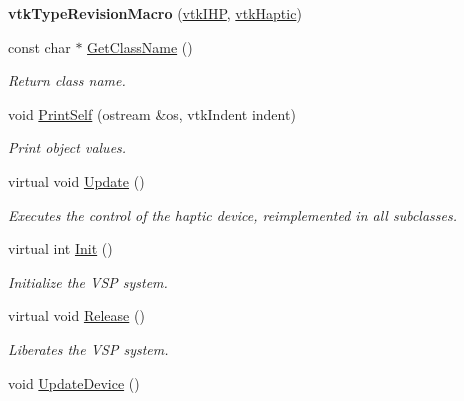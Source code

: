 \begin{DoxyCompactItemize}
\item 
\hypertarget{classvtkIHP_a00411adcf823417149c18bb208d31d4b}{
{\bfseries vtkTypeRevisionMacro} (\hyperlink{classvtkIHP}{vtkIHP}, \hyperlink{classvtkHaptic}{vtkHaptic})}
\label{classvtkIHP_a00411adcf823417149c18bb208d31d4b}

\item 
\hypertarget{classvtkIHP_a807bb9b0218e7d62682ff1c443c14888}{
const char $\ast$ \hyperlink{classvtkIHP_a807bb9b0218e7d62682ff1c443c14888}{GetClassName} ()}
\label{classvtkIHP_a807bb9b0218e7d62682ff1c443c14888}

\begin{DoxyCompactList}\small\item\em Return class name. \item\end{DoxyCompactList}\item 
\hypertarget{classvtkIHP_a9f7937146d91110b7dfae3eb7712fcca}{
void \hyperlink{classvtkIHP_a9f7937146d91110b7dfae3eb7712fcca}{PrintSelf} (ostream \&os, vtkIndent indent)}
\label{classvtkIHP_a9f7937146d91110b7dfae3eb7712fcca}

\begin{DoxyCompactList}\small\item\em Print object values. \item\end{DoxyCompactList}\item 
virtual void \hyperlink{classvtkIHP_a0777ce95f933e80ccfb47f4ebadcf1ec}{Update} ()
\begin{DoxyCompactList}\small\item\em Executes the control of the haptic device, reimplemented in all subclasses. \item\end{DoxyCompactList}\item 
virtual int \hyperlink{classvtkIHP_a055cc6c8150236aa3899647e32c3a0da}{Init} ()
\begin{DoxyCompactList}\small\item\em Initialize the VSP system. \item\end{DoxyCompactList}\item 
\hypertarget{classvtkIHP_a7b0ac0f3e862d015fa3f27489679aad3}{
virtual void \hyperlink{classvtkIHP_a7b0ac0f3e862d015fa3f27489679aad3}{Release} ()}
\label{classvtkIHP_a7b0ac0f3e862d015fa3f27489679aad3}

\begin{DoxyCompactList}\small\item\em Liberates the VSP system. \item\end{DoxyCompactList}\item 
\hypertarget{classvtkIHP_a34e27f626efe2aa7194b636e6b25a1f4}{
void \hyperlink{classvtkIHP_a34e27f626efe2aa7194b636e6b25a1f4}{UpdateDevice} ()}
\label{classvtkIHP_a34e27f626efe2aa7194b636e6b25a1f4}


\end{DoxyCompactItemize}
